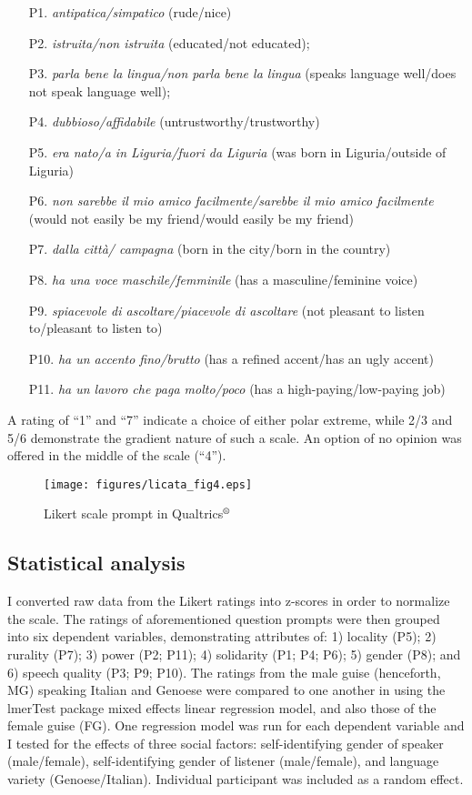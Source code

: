 \documentclass[output=paper,colorlinks,citecolor=brown]{langscibook}
\begin{document}
\begin{itemize}
    \item [P1.] \textit{antipatica/simpatico} (rude/nice)
    \item [P2.] \textit{istruita/non istruita} (educated/not educated);
    \item [P3.] \textit{parla bene la lingua/non parla bene la lingua} (speaks language well/does not speak language well);
    \item [P4.] \textit{dubbioso/affidabile} (untrustworthy/trustworthy)
    \item [P5.] 	\textit{era nato/a in Liguria/fuori da Liguria} (was born in Liguria/outside of Liguria)
    \item [P6.]	\textit{non sarebbe il mio amico facilmente/sarebbe il mio amico facilmente} (would not easily be my friend/would easily be my friend)
    \item [P7.]	\textit{dalla città/ campagna} (born in the city/born in the country)
    \item [P8.]	\textit{ha una voce maschile/femminile} (has a masculine/feminine voice)
    \item [P9.] 	\textit{spiacevole di ascoltare/piacevole di ascoltare} (not pleasant to listen to/pleasant to listen to)
    \item [P10.]	\textit{ha un accento fino/brutto} (has a refined accent/has an ugly accent)
    \item [P11.]	\textit{ha un lavoro che paga molto/poco} (has a high-paying/low-paying job)
\end{itemize}

A rating of “1” and “7” indicate a choice of either polar extreme, while 2/3 and 5/6 demonstrate the gradient nature of such a scale. An option of no opinion was offered in the middle of the 
scale (“4”).

\begin{figure}
    \texttt{[image: figures/licata\_fig4.eps]}
    \caption{Likert scale prompt in Qualtrics$^{\text{\textregistered}}$}
    \label{fig:licata:04}
\end{figure}


\subsection{Statistical analysis}
I converted raw data from the Likert ratings into z-scores in order to normalize the scale. The ratings of aforementioned question prompts were then grouped into six dependent 
variables, demonstrating attributes of: 1) locality (P5); 2) rurality (P7); 3) power (P2; P11); 4) solidarity (P1; P4; P6); 5) gender (P8); and 6) speech quality (P3; P9; P10). The ratings from the male guise (henceforth, MG) speaking Italian and Genoese were compared to one another in \citep{rcor18} using the lmerTest package \citep{kuzn17} mixed effects linear regression model, and also those of the female guise (FG). One regression model was run for each dependent variable and I tested for the effects of three social factors: self-identifying gender of speaker (male/female), self-identifying gender of listener (male/female), and language variety (Genoese/Italian). Individual participant was included as a random effect.
\end{document}
